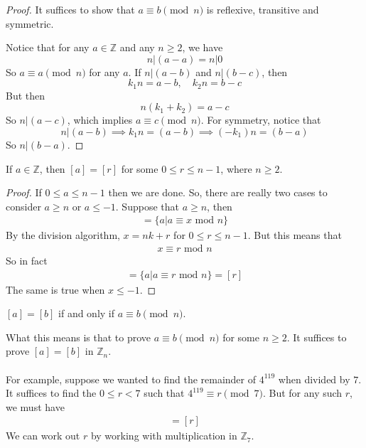 \documentclass{article}
\begin{document}
\begin{proof}
    It suffices to show that $a\equiv b \pmod{n}$ is reflexive, transitive and symmetric.
    
    \vspace{4mm}
    Notice that for any $a\in \mathbb{Z}$ and any $n\geq 2$, we have 
    \[ n|(a-a)=n|0\]
    So $a\equiv a \pmod{n}$ for any $a$. If $n|(a-b)$ and $n|(b-c)$, then
    \[k_1n=a-b, \quad k_2n=b-c\]
    But then 
    \[n(k_1+k_2)= a-c\]
    So $n|(a-c)$, which implies $a\equiv c\pmod{n}$. For symmetry, notice that 
    \[n|(a-b) \implies k_1n=(a-b) \implies (-k_1)n =(b-a)\]
    So $n|(b-a)$.
    \vspace{4mm}
\end{proof}
\begin{theorem}
    If $a\in \mathbb{Z}$, then $[a]=[r]$ for some $0\leq r\leq n-1$, where $n\geq 2$.
\end{theorem}
\begin{proof}
    If $0\leq a\leq n-1$ then we are done. So, there are really two cases to consider
    $a\geq n$ or $a\leq -1$. Suppose that $a\geq n$, then
    \begin{align*}
        [x]=\{a | a\equiv x \text{ mod }n\}
    \end{align*}
    By the division algorithm, $x=nk+r$ for $0\leq r \leq n-1$. But this means that 
    \begin{align*}
        x\equiv r \text{ mod } n
    \end{align*}
    So in fact 
    \begin{align*}
        [x]=\{a | a\equiv r \text{ mod }n\}=[r]
    \end{align*}
    The same is true when $x\leq -1$.
\end{proof}
\begin{theorem}
$[a]=[b]$ if and only if $a\equiv b \pmod{n}$.
\end{theorem}
What this means is that to prove $a\equiv b \pmod{n}$ for some $n\geq 2$. It suffices 
to prove $[a] =[b]$ in $\mathbb{Z}_n$.
\\\\
For example, suppose we wanted to find the remainder of $4^{119}$ when divided by $7$.
It suffices to find the $0\leq r < 7$ such that $4^{119} \equiv r \pmod{7}$. But for any such $r$, we must have
\begin{align*}
    [4^{119}]= [r]
\end{align*}
We can work out $r$ by working with multiplication in $\mathbb{Z}_7$.\\\\
\end{document}
